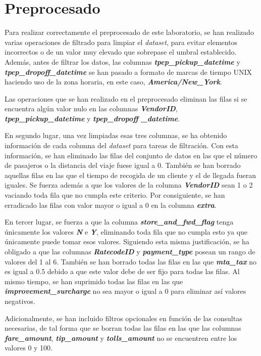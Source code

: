 \section{Preprocesado}

Para realizar correctamente el preprocesado de este laboratorio, se han realizado varias operaciones de filtrado para limpiar el \textit{dataset}, para evitar elementos incorrectos o de un valor muy elevado que sobrepase el umbral establecido. Además, antes de filtrar los datos, las columnas \textbf{\textit{tpep\_pickup\_datetime}} y \textbf{\textit{tpep\_dropoff\_datetime}} se han pasado a formato de marcas de tiempo UNIX haciendo uso de la zona horaria, en este caso, \textbf{\textit{America/New\_York}}.

Las operaciones que se han realizado en el preprocesado eliminan las filas si se encuentra algún valor nulo en las columnas \textbf{\textit{VendorID}}, \textbf{\textit{tpep\_pickup\_datetime}} y \textbf{\textit{tpep\_dropoff
\_datetime}}.

En segundo lugar, una vez limpiadas esas tres columnas, se ha obtenido información de cada columna del \textit{dataset} para tareas de filtración. Con esta información, se han eliminado las filas del conjunto de datos en las que el número de pasajeros o la distancia del viaje fuese igual a 0. También se han borrado aquellas filas en las que el tiempo de recogida de un cliente y el de llegada fueran iguales. Se fuerza además a que los valores de la columna \textbf{\textit{VendorID}} sean 1 o 2 vaciando toda fila que no cumpla este criterio. Por consiguiente, se han erradicado las filas con valor mayor o igual a 0 en la columna \textbf{\textit{extra}}.

En tercer lugar, se fuerza a que la columna \textbf{\textit{store\_and\_fwd\_flag}} tenga únicamente los valores \textbf{\textit{N}} e \textbf{\textit{Y}}, eliminando toda fila que no cumpla esto ya que únicamente puede tomar esos valores. Siguiendo esta misma justificación, se ha obligado a que las columnas \textbf{\textit{RatecodeID}} y \textbf{\textit{payment\_type}} posean un rango de valores del 1 al 6. También se han borrado todas las filas en las que \textbf{\textit{mta\_tax}} no es igual a 0.5 debido a que este valor debe de ser fijo para todas las filas. Al mismo tiempo, se han suprimido todas las filas en las que \textbf{\textit{improvement\_surcharge}} no sea mayor o igual a 0 para eliminar así valores negativos.

Adicionalmente, se han incluido filtros opcionales en función de las consultas necesarias, de tal forma que se borran todas las filas en las que las columnas \textbf{\textit{fare\_amount}}, \textbf{\textit{tip\_amount}} y \textbf{\textit{tolls\_amount}} no se encuentren entre los valores 0 y 100.
